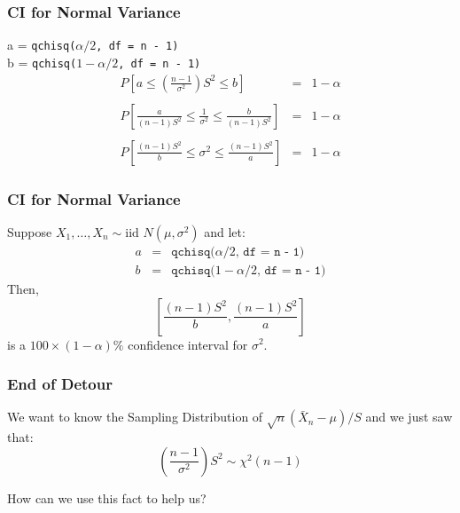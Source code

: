 \documentclass{beamer}
\begin{document}
\begin{frame}
\frametitle{CI for Normal Variance}
a = \texttt{qchisq($\alpha/2$, df = n - 1)} \\
b = \texttt{qchisq($1-\alpha/2$, df = n - 1)} 
\vspace{1em}
 	\begin{eqnarray*}
 		P\left[ a\leq   \left( \frac{n-1}{\sigma^2}\right)S^2 \leq b \right] &=& 1-\alpha \\ \\
 		P\left[ \frac{a}{(n-1)S^2}\leq  \frac{1}{\sigma^2} \leq \frac{b}{(n-1)S^2} \right] &=& 1-\alpha \\ \\ 
 				P\left[ \frac{(n-1)S^2}{b}\leq  \sigma^2 \leq \frac{(n-1)S^2}{a} \right] &=& 1-\alpha
 	\end{eqnarray*}	
\end{frame}

\begin{frame}
\frametitle{CI for Normal Variance}
Suppose $X_1, \hdots, X_n \sim \mbox{iid } N(\mu,\sigma^2)$ and let:
	\begin{eqnarray*}
		a &=& \texttt{qchisq($\alpha/2$, df = n - 1)} \\
		b &=& \texttt{qchisq($1-\alpha/2$, df = n - 1)} 
	\end{eqnarray*}
Then,
	$$\left[ \frac{(n-1)S^2}{b}, \frac{(n-1)S^2}{a} \right]$$
is a $100\times(1-\alpha)\%$ confidence interval for $\sigma^2$.
\end{frame}

\begin{frame}
\frametitle{End of Detour}
We want to know the Sampling Distribution of $\sqrt{n}(\bar{X}_n - \mu)/S$ and we just saw that:
$$\boxed{\left( \frac{n-1}{\sigma^2}\right)S^2\sim \chi^2(n-1)}$$
\begin{alertblock}{How can we use this fact to help us?}
\end{alertblock}
\end{frame}
\end{document}
